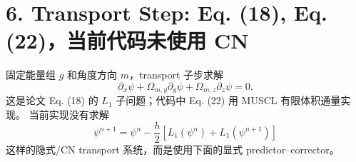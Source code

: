 \documentclass[11pt,a4paper]{ctexart}
\begin{document}
\section*{6. Transport Step: Eq. (18), Eq. (22)，当前代码未使用 CN}

固定能量组 \(g\) 和角度方向 \(m\)，transport 子步求解
\begin{equation}
  \partial_x \psi
  +
  \Omega_{m,y}\partial_y\psi
  +
  \Omega_{m,z}\partial_z\psi
  =
  0.
\end{equation}
这是论文 Eq. (18) 的 \(L_1\) 子问题；代码中 Eq. (22) 用 MUSCL 有限体积通量实现。
当前实现没有求解
\begin{equation}
  \psi^{n+1}
  =
  \psi^n-\frac{h}{2}
  \left[L_1(\psi^n)+L_1(\psi^{n+1})\right]
\end{equation}
这样的隐式/CN transport 系统，而是使用下面的显式 predictor--corrector。
\end{document}

